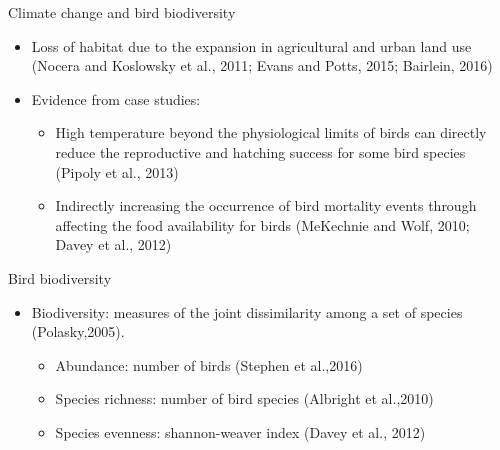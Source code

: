 \documentclass[handout]{beamer}
\begin{document}
\begin{frame}{Climate change and bird biodiversity}
\begin{itemize}
  \item Loss of habitat due to the expansion in agricultural and urban land use (Nocera and Koslowsky et al., 2011; Evans and Potts, 2015; Bairlein, 2016)
  \item Evidence from case studies:
  \begin{itemize}
  \item High temperature beyond the physiological limits of birds can directly reduce the reproductive and hatching success for some bird species (Pipoly et al., 2013)
  \item Indirectly increasing the occurrence of bird mortality events through affecting the food availability for birds (MeKechnie and Wolf, 2010; Davey et al., 2012)
   \end{itemize}
\end{itemize}
\end{frame}


\begin{frame}{Bird biodiversity}
  \begin{itemize}
    \item Biodiversity: measures of the joint dissimilarity among a set of species (Polasky,2005).
    \begin{itemize}
      \item Abundance: number of birds (Stephen et al.,2016)
      \item Species richness: number of bird species (Albright et al.,2010)
      \item Species evenness: shannon-weaver index (Davey et al., 2012)
    \end{itemize}
  \end{itemize}
\end{frame}
\end{document}
